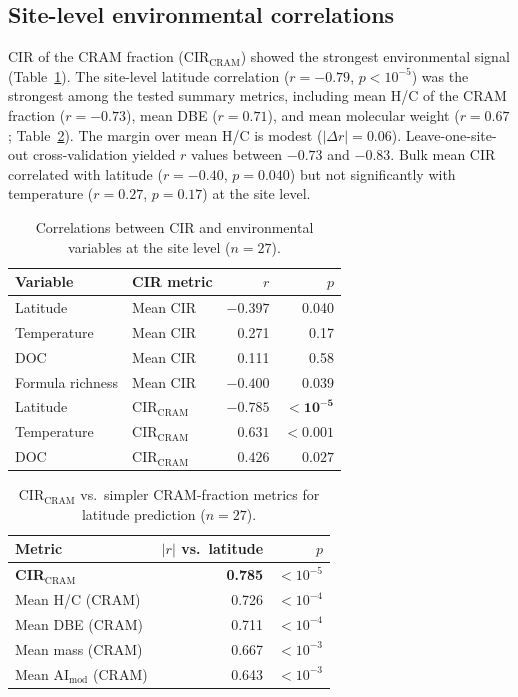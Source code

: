 \documentclass[12pt,letterpaper]{article}
\begin{document}
\subsection{Site-level environmental correlations}

CIR of the CRAM fraction (CIR$_\text{CRAM}$) showed the strongest environmental signal (Table~\ref{tab:correlations}). The site-level latitude correlation ($r = -0.79$, $p < 10^{-5}$) was the strongest among the tested summary metrics, including mean H/C of the CRAM fraction ($r = -0.73$), mean DBE ($r = 0.71$), and mean molecular weight ($r = 0.67$; Table~\ref{tab:comparison}). The margin over mean H/C is modest ($|\Delta r| = 0.06$). Leave-one-site-out cross-validation yielded $r$ values between $-0.73$ and $-0.83$. Bulk mean CIR correlated with latitude ($r = -0.40$, $p = 0.040$) but not significantly with temperature ($r = 0.27$, $p = 0.17$) at the site level.

\begin{table}[ht]
\centering
\caption{Correlations between CIR and environmental variables at the site level ($n = 27$).}
\label{tab:correlations}
\begin{tabular}{llrr}
\toprule
Variable & CIR metric & $r$ & $p$ \\
\midrule
Latitude & Mean CIR & $-0.397$ & 0.040 \\
Temperature & Mean CIR & 0.271 & 0.17 \\
DOC & Mean CIR & 0.111 & 0.58 \\
Formula richness & Mean CIR & $-0.400$ & 0.039 \\
Latitude & CIR$_\text{CRAM}$ & $\mathbf{-0.785}$ & $\mathbf{<10^{-5}}$ \\
Temperature & CIR$_\text{CRAM}$ & $\mathbf{0.631}$ & $\mathbf{<0.001}$ \\
DOC & CIR$_\text{CRAM}$ & $\mathbf{0.426}$ & $\mathbf{0.027}$ \\
\bottomrule
\end{tabular}
\end{table}

\begin{table}[ht]
\centering
\caption{CIR$_\text{CRAM}$ vs.\ simpler CRAM-fraction metrics for latitude prediction ($n = 27$).}
\label{tab:comparison}
\begin{tabular}{lrr}
\toprule
Metric & $|r|$ vs.\ latitude & $p$ \\
\midrule
\textbf{CIR$_\text{CRAM}$} & \textbf{0.785} & $<10^{-5}$ \\
Mean H/C (CRAM) & 0.726 & $<10^{-4}$ \\
Mean DBE (CRAM) & 0.711 & $<10^{-4}$ \\
Mean mass (CRAM) & 0.667 & $<10^{-3}$ \\
Mean AI$_\text{mod}$ (CRAM) & 0.643 & $<10^{-3}$ \\
\bottomrule
\end{tabular}
\end{table}
\end{document}
